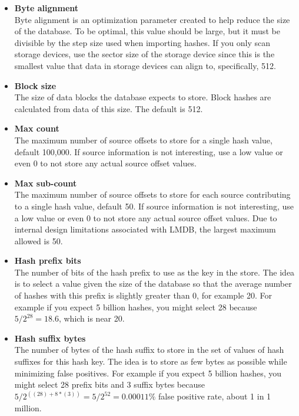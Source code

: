 \documentclass[11pt,fleqn]{article} %
\begin{document}
\begin{itemize}
\item \textbf{Byte alignment}\\
Byte alignment is an optimization parameter created to help reduce the size of the database. To be optimal, this value should be large, but it must be divisible by the step size used when importing hashes. If you only scan storage devices, use the sector size of the storage device since this is the smallest value that data in storage devices can align to, specifically, 512.

\item \textbf{Block size}\\
The size of data blocks the database expects to store. Block hashes are calculated from data of this size. The default is 512.

\item \textbf{Max count}\\
The maximum number of source offsets to store for a single hash value, default 100,000. If source information is not interesting, use a low value or even 0 to not store any actual source offset values.

\item \textbf{Max sub-count}\\
The maximum number of source offsets to store for each source contributing to a single hash value, default 50. If source information is not interesting, use a low value or even 0 to not store any actual source offset values. Due to internal design limitations associated with LMDB, the largest maximum allowed is 50.

\item \textbf{Hash prefix bits}\\
The number of bits of the hash prefix to use as the key in the store. The idea is to select a value given the size of the database so that the average number of hashes with this prefix is slightly greater than 0, for example 20. For example if you expect 5 billion hashes, you might select 28 because $5/2^{28}=18.6$, which is near 20.

\item \textbf{Hash suffix bytes}\\
The number of bytes of the hash suffix to store in the set of values of hash suffixes for this hash key. The idea is to store as few bytes as possible while minimizing false positives. For example if you expect 5 billion hashes, you might select 28 prefix bits and 3 suffix bytes because $5 / 2^{((28) + 8*(3))} = 5 / 2^{52} = 0.00011\%$ false positive rate, about 1 in 1 million.
\end{itemize}
\end{document}
